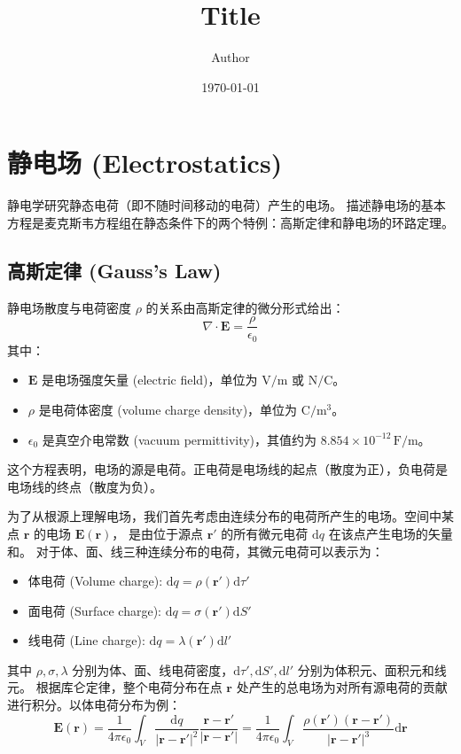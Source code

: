 \documentclass[fontset=none]{ctexart}
\title{Title}
\author{Author}
\date{\today}
\begin{document}

\section{静电场 (Electrostatics)}
静电学研究静态电荷（即不随时间移动的电荷）产生的电场。
描述静电场的基本方程是麦克斯韦方程组在静态条件下的两个特例：高斯定律和静电场的环路定理。

\subsection{高斯定律 (Gauss's Law)}
\begin{definition}
    静电场散度与电荷密度 $\rho$ 的关系由高斯定律的微分形式给出：
    \begin{equation}
        \nabla \cdot \bm{E} = \frac{\rho}{\epsilon_0}
    \end{equation}
    其中：
    \begin{itemize}
        \item $\bm{E}$ 是电场强度矢量 (electric field)，单位为 $\mathrm{V/m}$ 或 $\mathrm{N/C}$。
        \item $\rho$ 是电荷体密度 (volume charge density)，单位为 $\mathrm{C/m^3}$。
        \item $\epsilon_0$ 是真空介电常数 (vacuum permittivity)，其值约为 $8.854 \times 10^{-12} \, 
        \mathrm{F/m}$。
    \end{itemize}
    这个方程表明，电场的源是电荷。正电荷是电场线的起点（散度为正），负电荷是电场线的终点（散度为负）。
\end{definition}

为了从根源上理解电场，我们首先考虑由连续分布的电荷所产生的电场。空间中某点 $\bm{r}$ 的电场 $\bm{E}(\bm{r})$，
是由位于源点 $\bm{r'}$ 的所有微元电荷 $\mathrm{d}q$ 在该点产生电场的矢量和。
对于体、面、线三种连续分布的电荷，其微元电荷可以表示为：
\begin{itemize}
    \item 体电荷 (Volume charge): $\mathrm{d}q = \rho(\bm{r'}) \mathrm{d}\tau'$
    \item 面电荷 (Surface charge): $\mathrm{d}q = \sigma(\bm{r'}) \mathrm{d}S'$
    \item 线电荷 (Line charge): $\mathrm{d}q = \lambda(\bm{r'}) \mathrm{d}l'$
\end{itemize}
其中 $\rho, \sigma, \lambda$ 分别为体、面、线电荷密度，$\mathrm{d}\tau', \mathrm{d}S', 
\mathrm{d}l'$ 分别为体积元、面积元和线元。
根据库仑定律，整个电荷分布在点 $\bm{r}$ 处产生的总电场为对所有源电荷的贡献进行积分。以体电荷分布为例：
\begin{equation}
    \bm{E}(\bm{r}) = \frac{1}{4\pi\epsilon_0} \int_V \frac{\mathrm{d}q}{|\bm{r}-\bm{r'}|^2} \frac{\bm{r}-\bm{r'}}{|\bm{r}-\bm{r'}|} = \frac{1}{4\pi\epsilon_0} \int_V \frac{\rho(\bm{r'})(\bm{r}-\bm{r'})}{|\bm{r}-\bm{r'}|^3} \mathrm{d}\bm{r}
\end{equation}
\end{document}
